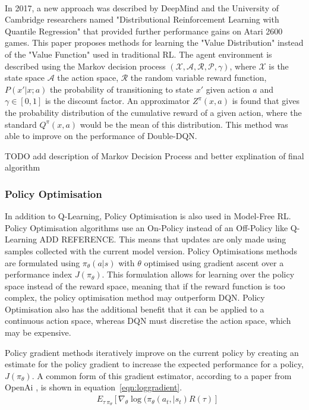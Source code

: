 \documentclass{article}
\begin{document}
\\
\sloppy In 2017, a new approach was described by DeepMind and the University of Cambridge researchers named "Distributional Reinforcement Learning with Quantile Regression"\cite{Dabney2017DistributionalRegression} that provided further performance gains on Atari 2600 games. This paper proposes methods for learning the "Value Distribution" instead of the "Value Function" used in traditional RL. The agent environment is described using the Markov decision process $(\mathcal{X}, \mathcal{A}, \mathcal{R}, \mathcal{P}, \gamma)$, where $\mathcal{X}$ is the state space $\mathcal{A}$ the action space, $\mathcal{R}$ the random variable reward function, $P(x'|x;a)$ the probability of transitioning to state $x'$ given action $a$ and $\gamma \in [0,1]$ is the discount factor. An approximator $Z^\pi(x,a)$ is found that gives the probability distribution of the cumulative reward of a given action, where the standard $Q^\pi(x,a)$ would be the mean of this distribution. This method was able to improve on the performance of Double-DQN. 

TODO add description of Markov Decision Process and better explination of final algorithm

\subsubsection{Policy Optimisation}

In addition to Q-Learning, Policy Optimisation is also used in Model-Free RL. Policy Optimisation algorithms use an On-Policy instead of an Off-Policy like Q-Learning ADD REFERENCE. This means that updates are only made using samples collected with the current model version. Policy Optimisations methods are formulated using $\pi_\theta(a|s)$ \cite{Huang2020Model-basedLearning} with $\theta$ optimised using gradient ascent over a performance index $J(\pi_{\theta})$. This formulation allows for learning over the policy space instead of the reward space, meaning that if the reward function is too complex, the policy optimisation method may outperform DQN. Policy Optimisation also has the additional benefit that it can be applied to a continuous action space, whereas DQN must discretise the action space, which may be expensive. 

Policy gradient methods iteratively improve on the current policy by creating an estimate for the policy gradient to increase the expected performance for a policy, $J(\pi_\theta)$. A common form of this gradient estimator, according to a paper from OpenAi \cite{Schulman2017ProximalAlgorithms}, is shown in equation~\ref{eqn:loggradient}.
\begin{align}
\label{eqn:loggradient}
    & E_{\tau ~ \pi_\theta}[\nabla_\theta \log(\pi_\theta(a_t,|s_t)R(\tau)]
\end{align}
\end{document}
